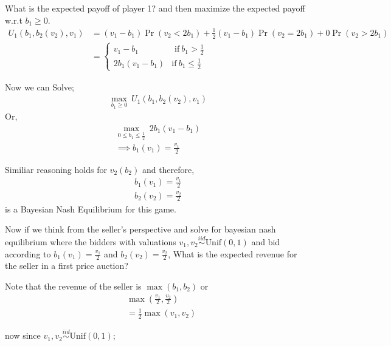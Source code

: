 \documentclass[12pt,a4paper]{article}
\begin{document}
What is the expected payoff of player 1? and then maximize the expected payoff w.r.t \(b_{1} \geq 0\).
\begin{align*}
    U_{1}(b_{1},b_{2}(v_{2}),v_{1})&= \left( v_{1}-b_{1} \right)\Pr(v_{2}<2b_{1}) + \frac{1}{2}(v_{1}-b_{1})\Pr(v_{2}=2b_{1}) + 0\Pr(v_{2}>2b_{1})\\
    &=\begin{cases}
        v_{1}-b_{1} & \text{ if} \ b_{1}>\frac{1}{2}\\
        2b_{1}\left( v_{1}-b_{1} \right) & \text{if} \ b_{1} \leq \frac{1}{2} 
    \end{cases}
\end{align*}  

Now we can Solve;  
\begin{align*}
    \max_{b_{1} \geq 0} \ U_{1}(b_{1},b_{2}(v_{2}),v_{1})
\end{align*}
Or,
\begin{align*}
    \max_{0 \leq b_{1} \leq \frac{1}{2}} \ 2b_{1}(v_{1}-b_{1})\\
    \implies b_{1}(v_{1})= \frac{v_{1}}{2}
\end{align*}

Similiar reasoning holds for \(v_{2}(b_{2})\)  and therefore,
\begin{equation*}
    \begin{split}
        b_{1}(v_{1})=\frac{v_{1}}{2}\\
        b_{2}(v_{2})=\frac{v_{2}}{2}
    \end{split}
\end{equation*}     
is a Bayesian Nash Equilibrium for this game.

Now if we think from the seller's perspective and solve for bayesian nash equilibrium where the bidders with valuations \(v_{1},v_{2} \overset{iid}{\sim}\text{Unif}(0,1)\)   and bid according to \(b_{1}(v_{1})=\frac{v_{1}}{2}\) and \(b_{2}(v_{2})=\frac{v_{2}}{2}\), What is the expected revenue for the seller in a first price auction? 

Note that the revenue of the seller is \(\max(b_{1},b_{2})\) or 
\begin{equation*}
    \begin{split}
        &\max(\frac{v_{1}}{2},\frac{v_{2}}{2})\\
        &=\frac{1}{2}\max(v_{1},v_{2})
    \end{split}
\end{equation*}    
 
now since \(v_{1},v_{2} \overset{iid}{\sim} \text{Unif}(0,1)\);
\end{document}
